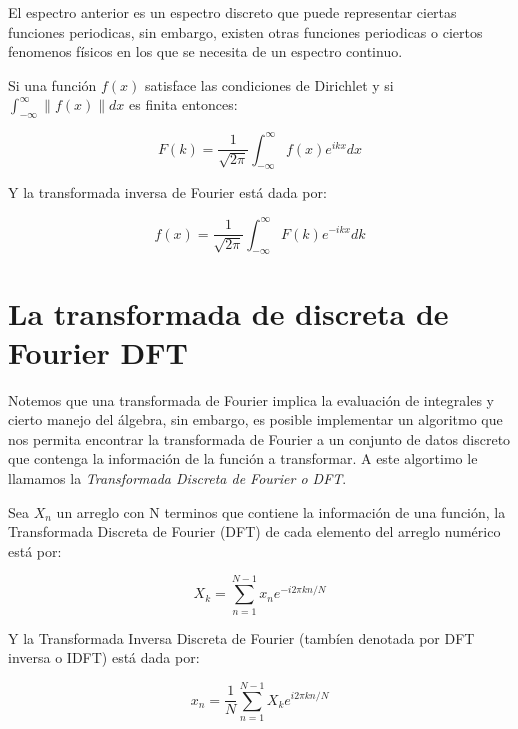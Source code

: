 El espectro anterior es un espectro discreto que puede representar ciertas funciones periodicas, sin embargo, existen
otras funciones periodicas o ciertos fenomenos físicos en los que se necesita de un espectro continuo. 
\begin{definition}
  Si una función $f(x)$ satisface las condiciones de Dirichlet y si $\int_{-\infty}^{\infty} \| f(x) \| dx $
  es finita entonces:

  \begin{equation}
    F(k) = \frac{1}{\sqrt{2\pi}} \int_{-\infty}^{\infty} f(x) e^{ikx} dx
  \end{equation}

  Y la transformada inversa de Fourier está dada por:

  \begin{equation}
    f(x) = \frac{1}{\sqrt{2\pi}} \int_{-\infty}^{\infty} F(k) e^{-ikx} dk
  \end{equation}

\end{definition}

\section{La transformada de discreta de Fourier DFT}
\label{La transformada de discreta de Fourier DFT}

Notemos que una transformada de Fourier implica la evaluación de integrales y cierto manejo del álgebra, sin embargo,
es posible implementar un algoritmo que nos permita encontrar la transformada de Fourier a un conjunto de datos
discreto que contenga la información de la función a transformar. A este algortimo le llamamos
la \emph{Transformada Discreta de Fourier o DFT}.

\begin{definition}[DFT]
  Sea $X_{n}$ un arreglo con N terminos que contiene la información de una función, la Transformada
  Discreta de Fourier (DFT) de cada elemento del arreglo numérico está por:

  \begin{equation}
    X_{k} = \sum_{n = 1}^{N-1} x_{n} e^{-i2\pi kn/N}
  \end{equation}

  Y la Transformada Inversa Discreta de Fourier (tambíen denotada por DFT inversa o IDFT) está dada por:

  \begin{equation}
    x_{n} = \frac{1}{N}  \sum_{n = 1}^{N-1} X_{k} e^{i2\pi kn/N}
  \end{equation}

\end{definition}

